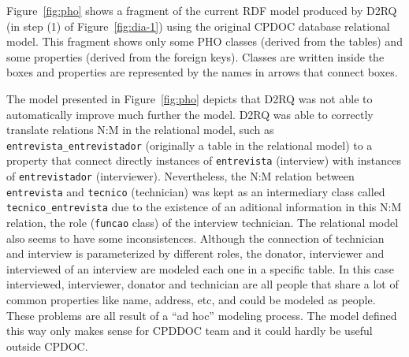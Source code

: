 

Figure~\ref{fig:pho} shows a fragment of the current RDF model
produced by D2RQ (in step (1) of Figure~\ref{fig:dia-1}) using the
original CPDOC database relational model. This fragment shows only
some PHO classes (derived from the tables) and some properties (derived
from the foreign keys). Classes are written inside the boxes and properties are
represented by the names in arrows that connect boxes.

The model presented in Figure~\ref{fig:pho} depicts
that D2RQ was not able to automatically improve much further the
model. D2RQ was able to correctly translate relations N:M in the
relational model, such as \texttt{entrevista\_entrevistador}
(originally a table in the relational model) to a property that
connect directly instances of \texttt{entrevista} (interview) with
instances of \texttt{entrevistador} (interviewer). Nevertheless, the
N:M relation between \texttt{entrevista} and \texttt{tecnico}
(technician) was kept as an intermediary class called
\texttt{tecnico\_entrevista} due to the existence of an aditional
information in this N:M relation, the role (\texttt{funcao} class) of
the interview technician. The relational model also seems to
have some inconsistences. Although the connection of technician and
interview is parameterized by different roles, the donator,
interviewer and interviewed of an interview are modeled each one in a
specific table. In this case interviewed, interviewer, donator and
technician are all people that share a lot of common properties like
name, address, etc, and could be modeled as people. These problems are
all result of a ``ad hoc'' modeling process. The model defined this way only
makes sense for CPDDOC team and it could hardly be useful outside
CPDOC.

